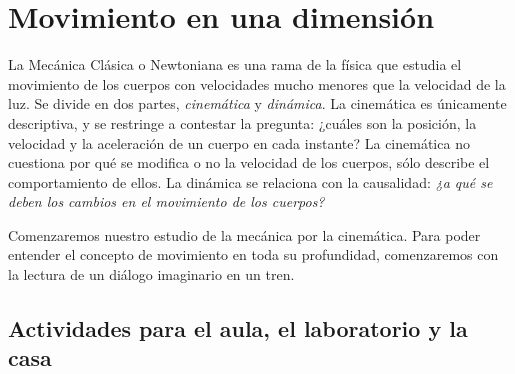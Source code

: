\documentclass[a4paper, twoside, 12pt]{report}
\begin{document}
\pagestyle{empty}
\chapter{Movimiento en una dimensión}
\thispagestyle{empty}
La Mecánica Clásica o Newtoniana es una rama de la física que estudia el movimiento de los cuerpos con velocidades mucho menores que la velocidad de la luz. Se divide en dos partes, {\it cinemática} y {\it dinámica}. La cinemática es únicamente descriptiva, y se restringe a contestar la pregunta: ¿cuáles son la posición, la velocidad y la aceleración de un cuerpo en cada instante? La cinemática no cuestiona por qué se modifica o no la velocidad de los cuerpos, sólo describe el comportamiento de ellos. La dinámica se relaciona con la causalidad: {\it ¿a qué se deben los cambios en el movimiento de los cuerpos?}

Comenzaremos nuestro estudio de la mecánica por la cinemática. Para poder entender el concepto de movimiento en toda su profundidad, comenzaremos con la lectura de un diálogo imaginario en un tren.











\newpage
\section{Actividades para el aula, el laboratorio y la casa}





\end{document}
